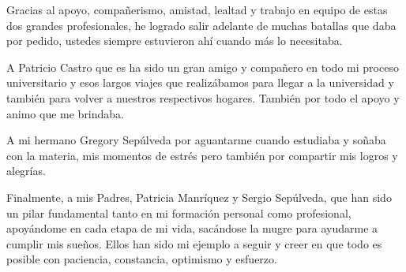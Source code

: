 \begin{acknowledgment}
    Gracias al apoyo, compañerismo, amistad, lealtad y trabajo en equipo de estas dos grandes profesionales, he logrado salir adelante de muchas batallas que daba por pedido, ustedes siempre estuvieron ahí cuando más lo necesitaba.
    
    A Patricio Castro que es ha sido un gran amigo y compañero en todo mi proceso universitario y esos largos viajes que realizábamos para llegar a la universidad y también para volver a nuestros respectivos hogares. También por todo el apoyo y animo que me brindaba.
    
    A mi hermano Gregory Sepúlveda por aguantarme cuando estudiaba y soñaba con la materia, mis momentos de estrés pero también por compartir mis logros y alegrías. 
    
    Finalmente, a mis Padres, Patricia Manríquez y Sergio Sepúlveda, que han sido un pilar fundamental tanto en mi formación personal como profesional, apoyándome en cada etapa de mi vida, sacándose la mugre para ayudarme a cumplir mis sueños. Ellos han sido mi ejemplo a seguir y creer en que todo es posible con paciencia, constancia, optimismo y esfuerzo.

\end{acknowledgment}